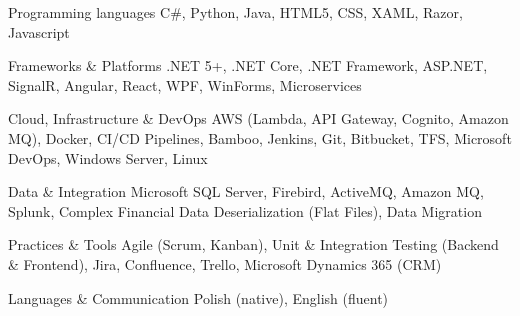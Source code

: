 

\begin{cvskills}

  \cvskill
    {Programming languages} %
    {C\#, Python, Java, HTML5, CSS, XAML, Razor, Javascript} %

  \cvskill
    {Frameworks \& Platforms} %
    {.NET 5+, .NET Core, .NET Framework, ASP.NET, SignalR, Angular, React, WPF, WinForms, Microservices} %

  \cvskill
    {Cloud, Infrastructure \& DevOps} %
    {AWS (Lambda, API Gateway, Cognito, Amazon MQ), Docker, CI/CD Pipelines, Bamboo, Jenkins, Git, Bitbucket, TFS, Microsoft DevOps, Windows Server, Linux} %

  \cvskill
    {Data \& Integration} %
    {Microsoft SQL Server, Firebird, ActiveMQ, Amazon MQ, Splunk, Complex Financial Data Deserialization (Flat Files), Data Migration} %

  \cvskill
    {Practices \& Tools} %
    {Agile (Scrum, Kanban), Unit \& Integration Testing (Backend \& Frontend), Jira, Confluence, Trello, Microsoft Dynamics 365 (CRM)} %

  \cvskill
    {Languages \& Communication} %
    {Polish (native), English (fluent)} %

\end{cvskills}
